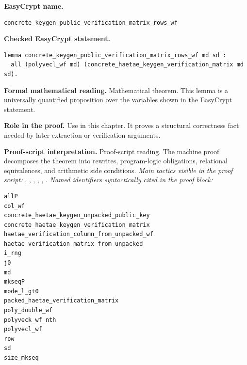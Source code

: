 \begin{formaltheorem}
\noindent\textbf{EasyCrypt name.}
\begin{lstlisting}[language=EasyCrypt,basicstyle=\ttfamily\scriptsize]
concrete_keygen_public_verification_matrix_rows_wf
\end{lstlisting}
\noindent\textbf{Checked EasyCrypt statement.}
\begin{lstlisting}[language=EasyCrypt,basicstyle=\ttfamily\scriptsize]
lemma concrete_keygen_public_verification_matrix_rows_wf md sd :
  all (polyvecl_wf md) (concrete_haetae_keygen_verification_matrix md sd).
\end{lstlisting}
\noindent\textbf{Formal mathematical reading.}
Mathematical theorem. This lemma is a universally quantified proposition over the variables shown in the EasyCrypt statement.

\noindent\textbf{Role in the proof.}
Use in this chapter. It proves a structural correctness fact needed by later extraction or verification arguments.

\noindent\textbf{Proof-script interpretation.}
Proof-script reading. The machine proof decomposes the theorem into rewrites, program-logic obligations, relational equivalences, and arithmetic side conditions.
\emph{Main tactics visible in the proof script:} , , , , , .
\emph{Named identifiers syntactically cited in the proof block:}
\begin{lstlisting}[language=EasyCrypt,basicstyle=\ttfamily\scriptsize]
allP
col_wf
concrete_haetae_keygen_unpacked_public_key
concrete_haetae_keygen_verification_matrix
haetae_verification_column_from_unpacked_wf
haetae_verification_matrix_from_unpacked
i_rng
j0
md
mkseqP
mode_l_gt0
packed_haetae_verification_matrix
poly_double_wf
polyveck_wf_nth
polyvecl_wf
row
sd
size_mkseq
\end{lstlisting}

\end{formaltheorem}

